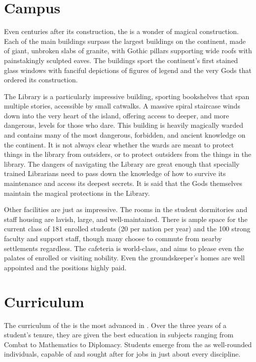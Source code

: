 \documentclass[blue]{GL2020}
\begin{document}
\section*{Campus}

Even centuries after its construction, the \pSc{} is a wonder of magical construction. Each of the main buildings surpass the largest buildings on the continent, made of giant, unbroken slabs of granite, with Gothic pillars supporting wide roofs with painstakingly sculpted eaves. The buildings sport the continent’s first stained glass windows with fanciful depictions of figures of legend and the very Gods that ordered its construction. 

The Library is a particularly impressive building, sporting bookshelves that span multiple stories, accessible by small catwalks. A massive spiral staircase winds down into the very heart of the island, offering access to deeper, and more dangerous, levels for those who dare. This building is heavily magically warded and contains many of the most dangerous, forbidden, and ancient knowledge on the continent. It is not always clear whether the wards are meant to protect things in the library from outsiders, or to protect outsiders from the things in the library. The dangers of navigating the Library are great enough that specially trained Librarians need to pass down the knowledge of how to survive its maintenance and access its deepest secrets. It is said that the Gods themselves maintain the magical protections in the Library.

Other facilities are just as impressive. The rooms in the student dormitories and staff housing are lavish, large, and well-maintained. There is ample space for the current class of 181 enrolled students (20 per nation per year) and the 100 strong faculty and support staff, though many choose to commute from nearby settlements regardless. The cafeteria is world-class, and aims to please even the palates of enrolled or visiting nobility. Even the groundskeeper’s homes are well appointed and the positions highly paid.

\section*{Curriculum}

The curriculum of the \pSc{} is the most advanced in \pEarth{}. Over the three years of a student’s tenure, they are given the best education in subjects ranging from Combat to Mathematics to Diplomacy. Students emerge from the \pSchool{} as well-rounded individuals, capable of and sought after for jobs in just about every discipline. 
\end{document}
